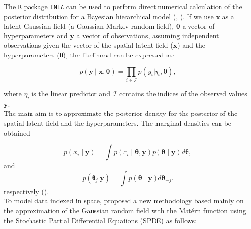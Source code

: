 \documentclass{article}
\begin{document}
\vspace{0.2cm}


The \texttt{R} package \texttt{INLA} can be used to perform direct numerical calculation of the posterior distribution for a Bayesian hierarchical model (\cite{rue2009approximate}, \cite{martino2009implementing}). If we use $\boldsymbol{x}$ as a latent Gaussian field (a Gaussian Markov random field), $\boldsymbol{\theta}$ a vector of hyperparameters and $\boldsymbol{y}$ a vector of observations, assuming independent observations given the vector of the spatial latent field ($\boldsymbol{x}$) and the hyperparameters ($\boldsymbol{\theta}$), the likelihood can be expressed as:

\begin{equation} \label{eqn:eq6}
p(\boldsymbol{y}\mid \boldsymbol{x},\boldsymbol{\theta}) =\prod_{i\in \mathcal{I}} p(y_i|\eta_i,\boldsymbol{\theta}),
\end{equation}

where $\eta_{i}$ is the linear predictor and $\mathcal{I}$ contains the indices of the observed values $\boldsymbol{y}$.  \\

The main aim is to approximate the posterior density for the posterior of the spatial latent field and the hyperparameters. The marginal densities can be obtained:

\begin{equation} \label{eqn:eq7}
p(x_i \mid \boldsymbol{y}) = \int p(x_i \mid \boldsymbol{\theta},\boldsymbol{y})  p(\boldsymbol{\theta} \mid \boldsymbol{y}) d\boldsymbol{\theta},
\end{equation}
and
\begin{equation} \label{eqn:eq8}
p(\boldsymbol{\theta}_j|\boldsymbol{y}) = \int p(\boldsymbol{\theta} \mid \boldsymbol{y})  d\boldsymbol{\theta}_{-j}.
\end{equation}
respectively (\cite{lindgren2015bayesian, krainski2018advanced}). \\


To model data indexed in space, \cite{lindgren2011explicit} proposed a new methodology based mainly on the approximation of the Gaussian random field with the Mat\'ern function using the Stochastic Partial Differential Equations (SPDE) as follows:
\end{document}
